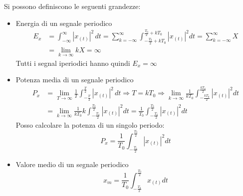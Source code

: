             Si possono definiscono le seguenti grandezze: 
            \begin{itemize}
                \item {Energia di un segnale periodico
                    \begin{align}
                        E_{x} & = \int_{-\infty}^{\infty}  |x_{(t)}|^2 \,dt =\sum_{k=-\infty}^{\infty}\int_{-\frac{T_0}{2}+kT_0}^{\frac{T_0}{2}+kT_0} |x_{(t)}|^2 dt =\sum_{k=-\infty}^{\infty} X  \nonumber \\
                            & = \lim_{k\rightarrow\infty} kX= \infty \nonumber
                    \end{align}
                    Tutti i segnal iperiodici hanno quindi $E_x = \infty$   
                }
                \item {Potenza media di un segnale periodico
                    \begin{align}
                        P_{x} & = \lim_{T\rightarrow\infty} \frac{1}{T} \int_{-\frac{T}{2}}^{\frac{T}{2}}  |x_{(t)}|^2 \,dt\Rightarrow T = kT_0 \Rightarrow \lim_{k\rightarrow\infty} \frac{1}{kT_0} \int_{-\frac{kT_0}{2}}^{\frac{kT_0}{2}} |x_{(t)}|^2 dt \nonumber \\
                            & = \lim_{k\rightarrow\infty} \frac{1}{kT_0} k \int_{-\frac{T_0}{2}}^{\frac{T_0}{2}} |x_{(t)}|^2 dt  = \frac{1}{T_0} \int_{-\frac{T_0}{2}}^{\frac{T_0}{2}} |x_{(t)}|^2 dt \nonumber
                    \end{align}      
                    Posso calcolare la potenza di un singolo periodo:
                    \[
                        P_x = \frac{1}{T_0} \int_{-\frac{T_0}{2}}^{\frac{T_0}{2}} |x_{(t)}|^2 dt  
                    \]
                }
                \item {Valore medio di un segnale periodico
                    \[
                        x_m = \frac{1}{T_0} \int_{-\frac{T_0}{2}}^{\frac{T_0}{2}} x_{(t)} dt  
                    \]
                }
            \end{itemize}   